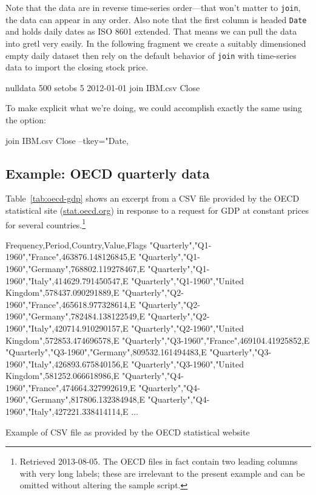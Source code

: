 Note that the data are in reverse time-series order---that won't
matter to \texttt{join}, the data can appear in any order. Also note
that the first column is headed \texttt{Date} and holds daily dates as
ISO 8601 extended. That means we can pull the data into gretl very
easily. In the following fragment we create a suitably dimensioned
empty daily dataset then rely on the default behavior of \texttt{join}
with time-series data to import the closing stock price.

\begin{code}
nulldata 500
setobs 5 2012-01-01
join IBM.csv Close
\end{code}

To make explicit what we're doing, we could accomplish exactly the
same using the  option:

\begin{code}
join IBM.csv Close --tkey="Date,%
\end{code}

\subsection{Example: OECD quarterly data}

Table~\ref{tab:oecd-gdp} shows an excerpt from a CSV file provided
by the OECD statistical site (\url{stat.oecd.org}) in response to a
request for GDP at constant prices for several
countries.\footnote{Retrieved 2013-08-05. The OECD files in fact
  contain two leading columns with very long labels; these are irrelevant
  to the present example and can be omitted without altering the
  sample script.}

\begin{table}[htbp]
\begin{code}
Frequency,Period,Country,Value,Flags
"Quarterly","Q1-1960","France",463876.148126845,E
"Quarterly","Q1-1960","Germany",768802.119278467,E
"Quarterly","Q1-1960","Italy",414629.791450547,E
"Quarterly","Q1-1960","United Kingdom",578437.090291889,E
"Quarterly","Q2-1960","France",465618.977328614,E
"Quarterly","Q2-1960","Germany",782484.138122549,E
"Quarterly","Q2-1960","Italy",420714.910290157,E
"Quarterly","Q2-1960","United Kingdom",572853.474696578,E
"Quarterly","Q3-1960","France",469104.41925852,E
"Quarterly","Q3-1960","Germany",809532.161494483,E
"Quarterly","Q3-1960","Italy",426893.675840156,E
"Quarterly","Q3-1960","United Kingdom",581252.066618986,E
"Quarterly","Q4-1960","France",474664.327992619,E
"Quarterly","Q4-1960","Germany",817806.132384948,E
"Quarterly","Q4-1960","Italy",427221.338414114,E
...
\end{code}
\caption{Example of CSV file as provided by the OECD statistical
  website}
\label{tab:oecd-gdp}  
\end{table}

